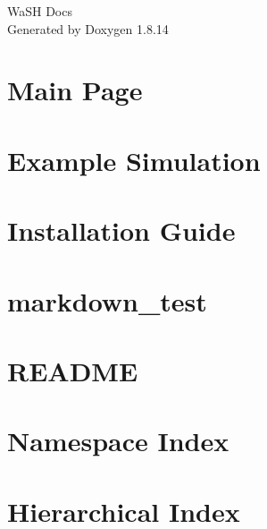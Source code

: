 \documentclass[twoside]{book}
\newcommand{\+}{\discretionary{\mbox{\scriptsize$\hookleftarrow$}}{}{}}
\newcommand{\clearemptydoublepage}{%
  \newpage{\pagestyle{empty}\cleardoublepage}%
}
\begin{document}
\hypersetup{pageanchor=false,
             bookmarksnumbered=true,
             pdfencoding=unicode
            }
\begin{titlepage}
\vspace*{7cm}
\begin{center}%
{\Large Wa\+SH Docs }\\
\vspace*{1cm}
{\large Generated by Doxygen 1.8.14}\\
\end{center}
\end{titlepage}
\clearemptydoublepage
{}
\tableofcontents
\clearemptydoublepage
{}
\hypersetup{pageanchor=true}

\chapter{Main Page}
\label{index}\hypertarget{index}{}
\chapter{Example Simulation}
\label{md_markdown_example_usecase}

\chapter{Installation Guide}
\label{md_markdown_installation}

\chapter{markdown\+\_\+test}
\label{md_markdown_markdown_test}

\chapter{R\+E\+A\+D\+ME}
\label{md__dcs_20_u2002000_4thYearProject_wash_README}

\chapter{Namespace Index}

\chapter{Hierarchical Index}

\end{document}
